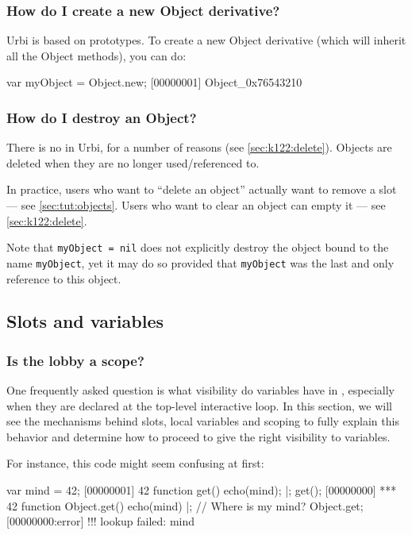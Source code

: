 \subsubsection{How do I create a new Object derivative?}
Urbi is based on prototypes. To create a new Object derivative (which
will inherit all the Object methods), you can do:

\begin{urbiscript}
var myObject = Object.new;
[00000001] Object_0x76543210
\end{urbiscript}

\subsubsection{How do I destroy an Object?}
There is no  in Urbi, for a number of reasons (see
\autoref{sec:k122:delete}).  Objects are deleted when they are no
longer used/referenced to.

In practice, users who want to ``delete an object'' actually want to
remove a slot --- see \autoref{sec:tut:objects}.  Users who want to
clear an object can empty it --- see \autoref{sec:k122:delete}.

Note that \lstinline{myObject = nil} does not explicitly destroy the
object bound to the name \lstinline{myObject}, yet it may do
so provided that \lstinline{myObject} was the last and only reference
to this object.

\subsection{Slots and variables}

\subsubsection{Is the lobby a scope?}

One frequently asked question is what visibility do variables have in
\us, especially when they are declared at the top-level interactive
loop.  In this section, we will see the mechanisms behind slots, local
variables and scoping to fully explain this behavior and determine how
to proceed to give the right visibility to variables.

For instance, this code might seem confusing at first:

\begin{urbiscript}
var mind = 42;
[00000001] 42
function get()
{
  echo(mind);
}|;
get();
[00000000] *** 42
function Object.get()
{
  echo(mind)
}|;
// Where is my mind?
Object.get;
[00000000:error] !!! lookup failed: mind
\end{urbiscript}

